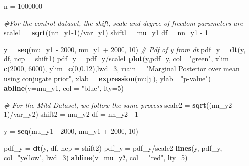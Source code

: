 \documentclass[]{article}
\newenvironment{Shaded}{\begin{snugshade}}{\end{snugshade}}
\newcommand{\KeywordTok}[1]{\textcolor[rgb]{0.13,0.29,0.53}{\textbf{{#1}}}}
\newcommand{\DataTypeTok}[1]{\textcolor[rgb]{0.13,0.29,0.53}{{#1}}}
\newcommand{\DecValTok}[1]{\textcolor[rgb]{0.00,0.00,0.81}{{#1}}}
\newcommand{\FloatTok}[1]{\textcolor[rgb]{0.00,0.00,0.81}{{#1}}}
\newcommand{\StringTok}[1]{\textcolor[rgb]{0.31,0.60,0.02}{{#1}}}
\newcommand{\CommentTok}[1]{\textcolor[rgb]{0.56,0.35,0.01}{\textit{{#1}}}}
\newcommand{\NormalTok}[1]{{#1}}
\begin{document}
\begin{Shaded}
\begin{Highlighting}[]
\NormalTok{n =}\StringTok{ }\DecValTok{1000000}

\CommentTok{#For the control dataset, the shift, scale and degree of freedom parameters are}
\NormalTok{scale1 =}\StringTok{ }\KeywordTok{sqrt}\NormalTok{((nn_y1}\DecValTok{-1}\NormalTok{)/var_y1)}
\NormalTok{shift1 =}\StringTok{ }\NormalTok{mu_y1}
\NormalTok{df =}\StringTok{ }\NormalTok{nn_y1 -}\StringTok{ }\DecValTok{1}

\NormalTok{y =}\StringTok{ }\KeywordTok{seq}\NormalTok{(mu_y1 -}\StringTok{ }\DecValTok{2000}\NormalTok{, mu_y1 +}\StringTok{ }\DecValTok{2000}\NormalTok{, }\DecValTok{10}\NormalTok{)}
\CommentTok{# Pdf of y from dt}
\NormalTok{pdf_y =}\StringTok{ }\KeywordTok{dt}\NormalTok{(y, df, }\DataTypeTok{ncp =} \NormalTok{shift1)}
\NormalTok{pdf_y =}\StringTok{ }\NormalTok{pdf_y/scale1}
\KeywordTok{plot}\NormalTok{(y,pdf_y, }\DataTypeTok{col =}\StringTok{"green"}\NormalTok{, }\DataTypeTok{xlim =} \KeywordTok{c}\NormalTok{(}\DecValTok{2000}\NormalTok{, }\DecValTok{6000}\NormalTok{), }\DataTypeTok{ylim=}\KeywordTok{c}\NormalTok{(}\DecValTok{0}\NormalTok{,}\FloatTok{0.12}\NormalTok{),}\DataTypeTok{lwd=}\DecValTok{3}\NormalTok{, }\DataTypeTok{main =} \StringTok{"Marginal Posterior over mean using conjugate prior"}\NormalTok{, }\DataTypeTok{xlab =} \KeywordTok{expression}\NormalTok{(mu[j]), }\DataTypeTok{ylab=} \StringTok{"p-value"}\NormalTok{)}
\KeywordTok{abline}\NormalTok{(}\DataTypeTok{v=}\NormalTok{mu_y1, }\DataTypeTok{col =} \StringTok{"blue"}\NormalTok{, }\DataTypeTok{lty=}\DecValTok{5}\NormalTok{)}

\CommentTok{# For the Mild Dataset, we follow the same process}
\NormalTok{scale2 =}\StringTok{ }\KeywordTok{sqrt}\NormalTok{((nn_y2}\DecValTok{-1}\NormalTok{)/var_y2)}
\NormalTok{shift2 =}\StringTok{ }\NormalTok{mu_y2}
\NormalTok{df =}\StringTok{ }\NormalTok{nn_y2 -}\StringTok{ }\DecValTok{1}

\NormalTok{y =}\StringTok{ }\KeywordTok{seq}\NormalTok{(mu_y1 -}\StringTok{ }\DecValTok{2000}\NormalTok{, mu_y1 +}\StringTok{ }\DecValTok{2000}\NormalTok{, }\DecValTok{10}\NormalTok{)}

\NormalTok{pdf_y =}\StringTok{ }\KeywordTok{dt}\NormalTok{(y, df, }\DataTypeTok{ncp =} \NormalTok{shift2)}
\NormalTok{pdf_y =}\StringTok{ }\NormalTok{pdf_y/scale2}
\KeywordTok{lines}\NormalTok{(y, pdf_y, }\DataTypeTok{col=}\StringTok{"yellow"}\NormalTok{, }\DataTypeTok{lwd=}\DecValTok{3}\NormalTok{)}
\KeywordTok{abline}\NormalTok{(}\DataTypeTok{v=}\NormalTok{mu_y2, }\DataTypeTok{col =} \StringTok{"red"}\NormalTok{, }\DataTypeTok{lty=}\DecValTok{5}\NormalTok{)}


\end{Highlighting}
\end{Shaded}
\end{document}
